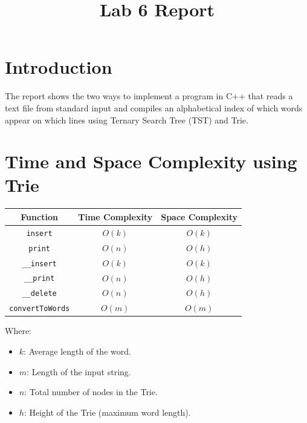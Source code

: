 \documentclass{rapport}
\title{Lab 6 Report} %
\begin{document}

\subject{CSCI 612: Applied Computer Vision} %



        
\buildmargins %
\buildcover %
\toc %

\section{Introduction}
The report shows the two ways to implement a program in C++ that reads a text file from standard input and compiles an alphabetical index of which words appear on which lines using Ternary Search Tree (TST) and Trie.

\section{Time and Space Complexity using Trie}

\begin{center}
\begin{tabular}{|c|c|c|}
\hline
\textbf{Function} & \textbf{Time Complexity} & \textbf{Space Complexity} \\
\hline
\texttt{insert} & \(O(k)\) & \(O(k)\) \\
\hline
\texttt{print} & \(O(n)\) & \(O(h)\) \\
\hline
\texttt{\_\_insert} & \(O(k)\) & \(O(k)\) \\
\hline
\texttt{\_\_print} & \(O(n)\) & \(O(h)\) \\
\hline
\texttt{\_\_delete} & \(O(n)\) & \(O(h)\) \\
\hline
\texttt{convertToWords} & \(O(m)\) & \(O(m)\) \\
\hline
\end{tabular}
\end{center}
Where:
\begin{itemize}
    \item \(k\): Average length of the word.
    \item \(m\): Length of the input string.
    \item \(n\): Total number of nodes in the Trie.
    \item \(h\): Height of the Trie (maximum word length).
\end{itemize}
\end{document}
